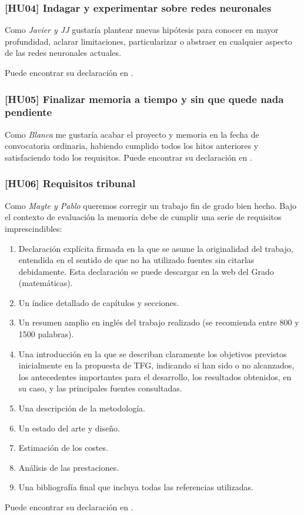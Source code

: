 \subsubsection*{ [HU04] Indagar y experimentar sobre redes neuronales}

Como \textit{Javier y JJ} gustaría plantear nuevas hipótesis para conocer en mayor profundidad, 
aclarar limitaciones, particularizar o abstraer en cualquier aspecto de las redes neuronales actuales.

Puede encontrar su declaración en \cite{TFG-Estudio-de-las-redes-neuronales-HU04}.

\subsubsection*{[HU05] Finalizar memoria a tiempo y sin que quede nada pendiente}

Como \textit{Blanca} me gustaría acabar el proyecto y memoria en la fecha de convocatoria ordinaria, habiendo cumplido todos los hitos anteriores y satisfaciendo todo los requisitos.
Puede encontrar su declaración en \cite{TFG-Estudio-de-las-redes-neuronales-HU05}.

\subsubsection*{[HU06] Requisitos tribunal}
Como \textit{Mayte y Pablo} queremos corregir un trabajo fin de grado bien hecho. 
Bajo el contexto de evaluación la memoria debe de cumplir una serie de requisitos imprescindibles:

\begin{enumerate}
    \item Declaración explícita firmada en la que se asume la originalidad del trabajo, entendida en el sentido de que no ha utilizado fuentes sin citarlas debidamente. Esta declaración se puede descargar en la web del Grado (matemáticas).
    \item Un índice detallado de capítulos y secciones.
    \item Un resumen amplio en inglés del trabajo realizado (se recomienda entre 800 y 1500 palabras).
    \item Una introducción en la que se describan claramente los objetivos previstos inicialmente en la propuesta de TFG, indicando si han sido o no alcanzados, los antecedentes importantes para el desarrollo, los resultados obtenidos, en su caso, y las principales fuentes consultadas.
    \item Una descripción de la metodología.
    \item Un estado del arte y diseño.
    \item Estimación de los costes.
    \item Análisis de las prestaciones.
    \item Una bibliografía final que incluya todas las referencias utilizadas.
\end{enumerate}
Puede encontrar su declaración en \cite{TFG-Estudio-de-las-redes-neuronales-HU06}.


